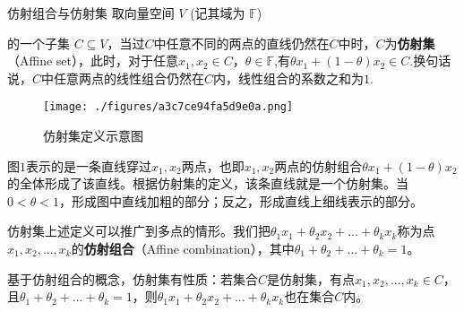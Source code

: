 
\begin{issues}
\issueDraft
\end{issues}


\begin{definition}{仿射组合与仿射集}
取向量空间 $V$ (记其域为 $\mathbb{F}$) 



的一个子集 $C \subseteq V$，当过$C$中任意不同的两点的直线仍然在$C$中时，$C$为\textbf{仿射集}（Affine set），此时，对于任意$x_1,x_2 \in C$，$\theta \in \mathbb{F}$,有$\theta x_1+(1-\theta)x_2 \in C$.换句话说，$C$中任意两点的线性组合仍然在$C$内，线性组合的系数之和为$1$.

\end{definition}

\begin{figure}[ht]
\centering
\texttt{[image: ./figures/a3c7ce94fa5d9e0a.png]}
\caption{仿射集定义示意图} \label{fig_AffSet_1}
\end{figure}

图$1$表示的是一条直线穿过$x_1,x_2$两点，也即$x_1,x_2$两点的仿射组合$\theta x_1+(1-\theta)x_2$的全体形成了该直线。根据仿射集的定义，该条直线就是一个仿射集。当$0<\theta<1$，形成图中直线加粗的部分；反之，形成直线上细线表示的部分。

仿射集上述定义可以推广到多点的情形。我们把$\theta_1x_1+\theta_2x_2+...+\theta_kx_k$称为点$x_1,x_2,...,x_k$的\textbf{仿射组合}（Affine combination），其中$\theta_1+\theta_2+...+\theta_k=1$。

基于仿射组合的概念，仿射集有性质：若集合$C$是仿射集，有点$x_1,x_2,...,x_k \in C$，且$\theta_1+\theta_2+...+\theta_k=1$，则$\theta_1x_1+\theta_2x_2+...+\theta_kx_k$也在集合$C$内。
